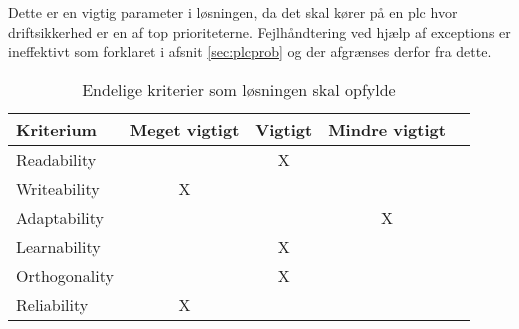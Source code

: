Dette er en vigtig parameter i løsningen, da det skal kører på en \gls{plc} hvor driftsikkerhed er en af top prioriteterne. Fejlhåndtering ved hjælp af exceptions er ineffektivt som forklaret i afsnit \ref{sec:plcprob} og der afgrænses derfor fra dette.

\begin{table}[H]
\centering
{}
\begin{tabular}{l c c c c}
\toprule
\textbf{Kriterium} & \textbf{Meget vigtigt} & \textbf{Vigtigt} & \textbf{Mindre vigtigt}  \\ \midrule
Readability        &   & X &       \\ 
Writeability       & X &   &       \\ 
Adaptability       &   &   & X     \\ 
Learnability       &   & X &       \\ 
Orthogonality      &   & X &       \\ 
Reliability        & X &   &       \\ \bottomrule
\end{tabular}
\caption{Endelige kriterier som løsningen skal opfylde}
\label{table:kriterier}
\end{table}





